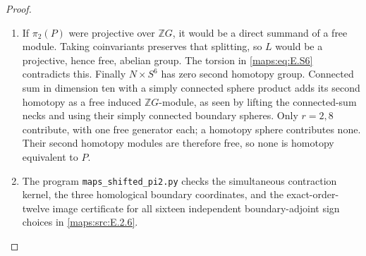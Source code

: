 \begin{proof}
\begin{enumerate}[label=\arabic*.,leftmargin=*]
\item If $\pi_2(P)$ were projective over $\mathbb ZG$, it would be
a direct summand of a free module. Taking coinvariants preserves
that splitting, so $L$ would be a projective, hence free,
abelian group. The torsion in \eqref{maps:eq:E.S6} contradicts this. Finally
$N\times S^6$ has zero second homotopy group. Connected sum in
dimension ten with a simply connected sphere product adds its
second homotopy as a free induced $\mathbb ZG$-module, as seen
by lifting the connected-sum necks and using their simply
connected boundary spheres. Only $r=2,8$ contribute, with one
free generator each; a homotopy sphere contributes none.
Their second homotopy modules are therefore free, so none is
homotopy equivalent to $P$.

\item The program \texttt{maps\_shifted\_pi2.py} checks the simultaneous
contraction kernel, the three homological boundary coordinates,
and the exact-order-twelve image certificate for all sixteen
independent boundary-adjoint sign choices in \ref{maps:src:E.2.6}.
\end{enumerate}
\end{proof}

